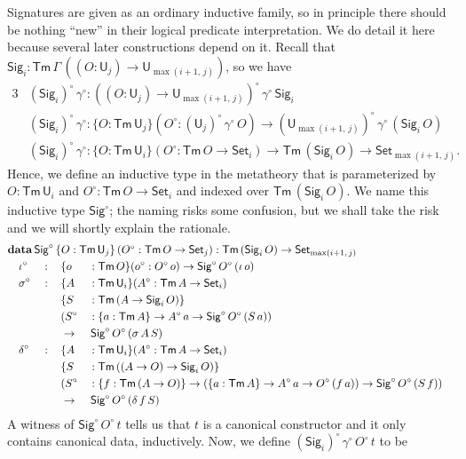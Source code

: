 \documentclass[acmsmall,screen,review]{acmart}
\newcommand{\msf}[1]{{\mathsf{#1}}}
\newcommand{\mbf}[1]{{\mathbf{#1}}}
\newcommand{\data}{\mbf{data}}
\newcommand{\U}{\msf{U}}
\newcommand{\Set}{\msf{Set}}
\newcommand{\Sig}{\msf{Sig}}
\newcommand{\Tm}{\msf{Tm}}
\newcommand{\w}{\circ}
\begin{document}
Signatures are given as an ordinary inductive family, so in principle there should be nothing
``new'' in their logical predicate interpretation. We do detail it here because several later
constructions depend on it. Recall that $\Sig_i : \Tm\,\Gamma\,((O : \U_j) \to \U_{\max(i+1,\,j)})$,
so we have
\begin{alignat*}{3}
  &(\Sig_i)^\w\,\gamma^\w : ((O : \U_j) \to \U_{\max(i+1,\,j)})^\w\,\gamma^\w\,\Sig_i\\
  &(\Sig_i)^\w\,\gamma^\w : \{O : \Tm\,\U_j\}(O^\w : (\U_j)^\w\,\gamma^\w\,O) \to (\U_{\max(i+1,\,j)})^\w\,\gamma^\w\,(\Sig_i\,O)\\
  &(\Sig_i)^\w\,\gamma^\w : \{O : \Tm\,\U_i\}(O^\w : \Tm\,O \to \Set_i) \to \Tm\,(\Sig_i\,O) \to \Set_{\max(i+1,\,j)}.
\end{alignat*}
Hence, we define an inductive type in the metatheory that is parameterized by $O : \Tm\,\U_i$ and
$O^\w : \Tm\,O \to \Set_i$ and indexed over $\Tm\,(\Sig_i\,O)$. We name this inductive type
$\Sig^\w$; the naming risks some confusion, but we shall take the risk and we will shortly
explain the rationale.
\begin{alignat*}{4}
  &\rlap{$\data\,\Sig^\w\,\{O : \Tm\,\U_j\}\,(O^\w : \Tm\,O \to \Set_j)  : \Tm\,(\Sig_i\,O) \to \Set_{\max(i+1,\,j)}$}\\
  &\quad \iota^\w  &&:\,&&\{o &&: \Tm\,O\}(o^\w : O^\w\,o) \to \Sig^\w\,O^\w\,(\iota\,o)\\
  &\quad \sigma^\w &&:\,&&\{A &&: \Tm\,\U_i\}(A^\w : \Tm\,A \to \Set_i)\\
  &               && &&\{S &&: \Tm\,(A \to \Sig_i\,O)\}\\
  &               && && (S^\w &&: \{a : \Tm\,A\} \to A^\w\,a \to \Sig^\w\,O^\w\,(S\,a))\\
  &               && && \to &&\,\Sig^\w\,O^\w\,(\sigma\,A\,S)\\
  &\quad \delta^\w &&:\,&&\{A &&: \Tm\,\U_i\}(A^\w : \Tm\,A \to \Set_i)\\
  &               &&   && \{S &&: \Tm\,((A \to O) \to \Sig_i\,O)\}\\
  &               &&   && (S^\w &&: \{f : \Tm\,(A \to O)\} \to (\{a : \Tm\,A\} \to A^\w\,a \to O^\w\,(f\,a)) \to \Sig^\w\,O^\w\,(S\,f))\\
  &\quad          &&   && \to &&\,\Sig^\w\,O^\w\,(\delta\,f\,S)
\end{alignat*}
A witness of $\Sig^\w\,O^\w\,t$ tells us that $t$ is a canonical constructor and it only contains
canonical data, inductively. Now, we define $(\Sig_i)^\w\,\gamma^\w\,O^\w\,t$ to be
\end{document}
